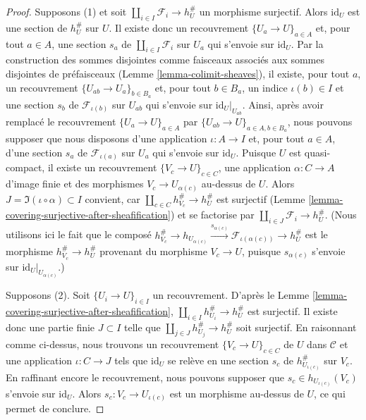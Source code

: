 \begin{proof}
Supposons (1) et soit $\coprod_{i \in I} \mathcal{F}_i \to h_U^\#$
un morphisme surjectif. Alors $\text{id}_U$ est une section de
$h_U^\#$ sur $U$. Il existe donc un recouvrement
$\{U_a \to U\}_{a \in A}$ et, pour tout $a \in A$,
une section $s_a$ de $\coprod_{i \in I} \mathcal{F}_i$
sur $U_a$ qui s’envoie sur $\text{id}_U$. Par la construction des sommes disjointes
comme faisceaux associés aux sommes disjointes de préfaisceaux
(Lemme \ref{lemma-colimit-sheaves}), il existe, pour tout $a$,
un recouvrement $\{U_{ab} \to U_a\}_{b \in B_a}$ et,
pour tout $b \in B_a$, un indice $\iota(b) \in I$ et une section
$s_{b}$ de $\mathcal{F}_{\iota(b)}$ sur $U_{ab}$
qui s’envoie sur $\text{id}_U|_{U_{ab}}$. Ainsi, après avoir remplacé
le recouvrement $\{U_a \to U\}_{a \in A}$ par
$\{U_{ab} \to U\}_{a \in A, b \in B_a}$,
nous pouvons supposer que nous disposons d’une application $\iota : A \to I$
et, pour tout $a \in A$, d’une section $s_a$ de $\mathcal{F}_{\iota(a)}$
sur $U_a$ qui s’envoie sur $\text{id}_U$.
Puisque $U$ est quasi-compact, il existe un recouvrement
$\{V_c \to U\}_{c \in C}$, une application $\alpha : C \to A$
d’image finie et des morphismes $V_c \to U_{\alpha(c)}$ au-dessus de $U$.
Alors $J = \Im(\iota \circ \alpha) \subset I$ convient,
car $\coprod_{c \in C} h_{V_c}^\# \to h_U^\#$ est surjectif
(Lemme \ref{lemma-covering-surjective-after-sheafification})
et se factorise par $\coprod_{i \in J} \mathcal{F}_i \to h_U^\#$.
(Nous utilisons ici le fait que le composé
$h_{V_c}^\# \to h_{U_{\alpha(c)}}
\xrightarrow{s_{\alpha(c)}} \mathcal{F}_{\iota(\alpha(c))} \to h_U^\#$
est le morphisme $h_{V_c}^\# \to h_U^\#$ provenant du morphisme
$V_c \to U$, puisque $s_{\alpha(c)}$ s’envoie sur
$\text{id}_U|_{U_{\alpha(c)}}$.)

\medskip\noindent
Supposons (2). Soit $\{U_i \to U\}_{i \in I}$ un recouvrement.
D’après le Lemme \ref{lemma-covering-surjective-after-sheafification},
$\coprod_{i \in I} h_{U_i}^\# \to h_U^\#$ est surjectif.
Il existe donc une partie finie $J \subset I$ telle que
$\coprod_{j \in J} h_{U_j}^\# \to h_U^\#$ soit surjectif.
En raisonnant comme ci-dessus, nous trouvons un recouvrement
$\{V_c \to U\}_{c \in C}$ de $U$ dans $\mathcal{C}$
et une application $\iota : C \to J$
tels que $\text{id}_U$ se relève en une section
$s_c$ de $h_{U_{\iota(c)}}^\#$ sur $V_c$.
En raffinant encore le recouvrement, nous pouvons supposer que
$s_c \in h_{U_{\iota(c)}}(V_c)$ s’envoie sur $\text{id}_U$.
Alors $s_c : V_c \to U_{\iota(c)}$ est un morphisme au-dessus de $U$,
ce qui permet de conclure.
\end{proof}

